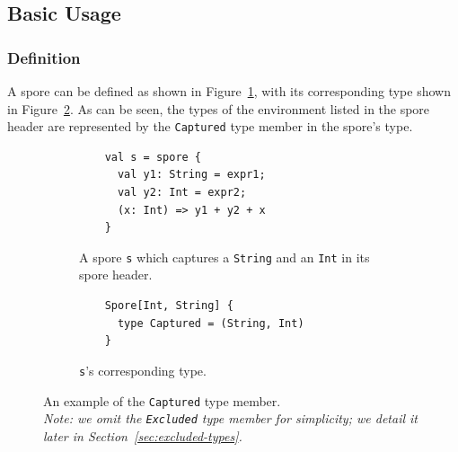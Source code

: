 \documentclass[runningheads]{llncs}
\begin{document}
\begin{sloppypar}




\vspace{2mm}
\subsection{Basic Usage}
\label{sec:basic-usage}
\vspace{1mm}


\subsubsection{Definition}

A spore can be defined as shown in Figure~\ref{fig:captured-spore}, with its
corresponding type shown in Figure~\ref{fig:captured-type}. As can be seen,
the types of the environment listed in the spore header are
represented by the \verb|Captured| type member in the spore's type.

\begin{figure}[t!]
\begin{subfigure}{.5\textwidth}
  \centering
  \begin{lstlisting}
    val s = spore {
      val y1: String = expr1;
      val y2: Int = expr2;
      (x: Int) => y1 + y2 + x
    }
  \end{lstlisting}
  \caption{A spore \texttt{s} which captures a \texttt{String} and an \texttt{Int} in its spore header.}
  \label{fig:captured-spore}
\end{subfigure}%
\begin{subfigure}{.5\textwidth}
  \centering
  \begin{lstlisting}
    Spore[Int, String] {
      type Captured = (String, Int)
    }
  \end{lstlisting}
  \caption{\texttt{s}'s corresponding type.}
  \label{fig:captured-type}
\end{subfigure}%
\vspace{1mm}
\caption{An example of the \texttt{Captured} type member. \\\textit{Note: we omit the
\texttt{Excluded} type member for simplicity; we detail it later in Section~\ref{sec:excluded-types}.}}
\label{fig:captured-ex}
\vspace{-5mm}
\end{figure}


\end{sloppypar}
\end{document}
